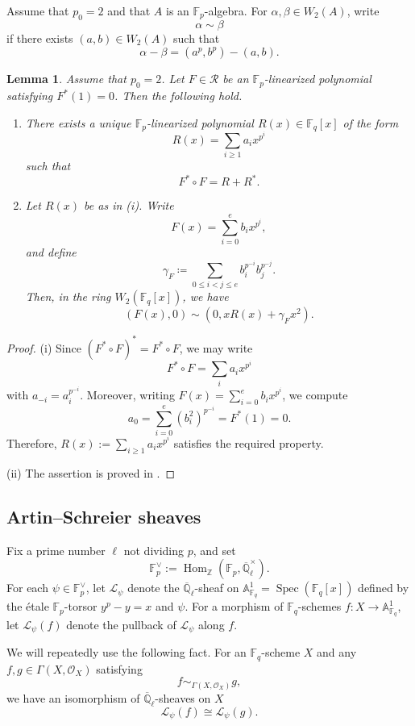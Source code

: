 \documentclass[12pt,a4paper]{amsart}
\newtheorem{lemma}[theorem]{Lemma}
\theoremstyle{definition}
\def\F{{\mathbb F}}
\def\Ql{\overline{\mathbb{Q}}_\ell}
\newcommand{\mc}{\mathcal}
\theoremstyle{remark}
\DeclareMathOperator{\Spec}{Spec}
\DeclareMathOperator{\Hom}{Hom}
\begin{document}
Assume that $p_0=2$  and that $A$ is an $\F_p$-algebra. 
For $\alpha,\beta\in W_2(A)$, write 
\[
\alpha\sim\beta
\]
if there exists $(a,b)\in W_2(A)$ such that 
\[
\alpha-\beta=(a^p,b^p)-(a,b). 
\]
\begin{lemma}\label{lem: Fast F=R+Rast}
Assume that $p_0=2$. 
Let $F\in\mc R$ be an $\F_p$-linearized polynomial satisfying $F^\ast(1)=0$. Then the following hold. 
\begin{enumerate}
    \item There exists a unique $\F_p$-linearized polynomial $R(x)\in \F_q[x]$ of the form 
    \[
    R(x)=\sum_{i\geq1}a_ix^{p^i}\]
    such that 
\begin{equation*}
F^\ast \circ F=R+R^\ast. 
\end{equation*}
\item 
Let $R(x)$ be as in {\rm (i)}. Write 
\[
F(x)=\sum_{i=0}^eb_ix^{p^i}, 
\]
and define 
\[
\gamma_F\coloneqq\sum_{0\le i<j\le e}b_i^{p^{-i}}b_j^{p^{-j}}. 
\]
Then, in the ring $W_2(\F_q[x])$, we have 
\[
(F(x),0)\sim (0,x R(x)+\gamma_Fx^2). 
\]
\end{enumerate}
\end{lemma}
\begin{proof}
(i) Since $(F^\ast\circ F)^\ast=F^\ast\circ F$, we may write  
\[
F^\ast\circ F=\sum_ia_ix^{p^i}
\]
with $a_{-i}=a_i^{p^{-i}}$. Moreover, writing $F(x)=\sum_{i=0}^eb_ix^{p^i}$, we compute 
\[
a_0=\sum_{i=0}^e(b_i^2)^{p^{-i}}=F^\ast(1)=0. 
\]
    Therefore, $R(x):=\sum_{i\ge1}a_ix^{p^i}$ satisfies the required property. 

    \medskip 

    \noindent
    (ii) The assertion is proved in \cite[Lemma~4.6]{ITT1}. 
\end{proof}

\subsection{Artin--Schreier sheaves}
Fix  a prime number $\ell$ not dividing $p$, and set \[\F_p^{\vee}:=\Hom_{\mathbb{Z}}(\F_p,\Ql^{\times}).\]
For each $\psi \in \F_p^{\vee}$,  let $\mathcal{L}_{\psi}$ denote the 
$\Ql$-sheaf on $\mathbb{A}^1_{\F_q}=\Spec (\F_q[x])$ defined by the \'etale $\F_p$-torsor 
$y^p-y=x$ and $\psi$. 
For a morphism of $\F_q$-schemes  
$f \colon X \to \mathbb{A}^1_{\F_q}$, let $\mathcal{L}_{\psi}(f)$
denote the pullback of $\mathcal{L}_{\psi}$ along $f$. 

We will repeatedly use the following fact.
For an $\F_q$-scheme $X$ and any $f,g\in\Gamma(X,\mc O_X)$ satisfying
\[
f\sim_{\Gamma(X,\mc O_X)}g, 
\]
we have an isomorphism of $\Ql$-sheaves on $X$
\[
\mathcal{L}_{\psi}(f) \cong \mathcal{L}_{\psi}(g). 
\]
\end{document}
